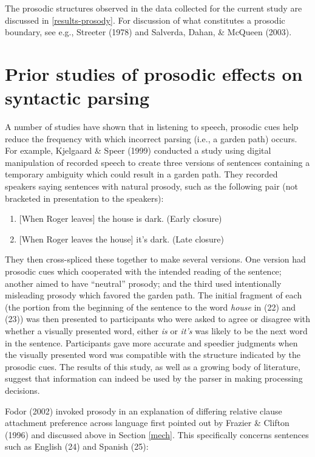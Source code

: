 \documentclass[11pt,oneside]{book}
\providecommand{\tightlist}{%
  \setlength{\itemsep}{0pt}\setlength{\parskip}{0pt}}
\begin{document}
The prosodic structures observed in the data collected for the current study are discussed in \ref{results-prosody}. For discussion of what constitutes a prosodic boundary, see e.g., Streeter (1978) and Salverda, Dahan, \& McQueen (2003).

\hypertarget{prosyn}{%
\section{Prior studies of prosodic effects on syntactic parsing}\label{prosyn}}

A number of studies have shown that in listening to speech, prosodic cues help reduce the frequency with which incorrect parsing (i.e., a garden path) occurs. For example, Kjelgaard \& Speer (1999) conducted a study using digital manipulation of recorded speech to create three versions of sentences containing a temporary ambiguity which could result in a garden path. They recorded speakers saying sentences with natural prosody, such as the following pair (not bracketed in presentation to the speakers):

\begin{enumerate}
\def\labelenumi{(\arabic{enumi})}
\setcounter{enumi}{21}
\tightlist
\item
  {[}When Roger leaves{]} the house is dark. (Early closure)
\item
  {[}When Roger leaves the house{]} it's dark. (Late closure)
\end{enumerate}

They then cross-spliced these together to make several versions. One version had prosodic cues which cooperated with the intended reading of the sentence; another aimed to have ``neutral'' prosody; and the third used intentionally misleading prosody which favored the garden path. The initial fragment of each (the portion from the beginning of the sentence to the word \emph{house} in (22) and (23)) was then presented to participants who were asked to agree or disagree with whether a visually presented word, either \emph{is} or \emph{it's} was likely to be the next word in the sentence. Participants gave more accurate and speedier judgments when the visually presented word was compatible with the structure indicated by the prosodic cues. The results of this study, as well as a growing body of literature, suggest that information can indeed be used by the parser in making processing decisions.

Fodor (2002) invoked prosody in an explanation of differing relative clause attachment preference across language first pointed out by Frazier \& Clifton (1996) and discussed above in Section \ref{mech}. This specifically concerns sentences such as English (24) and Spanish (25):
\end{document}
